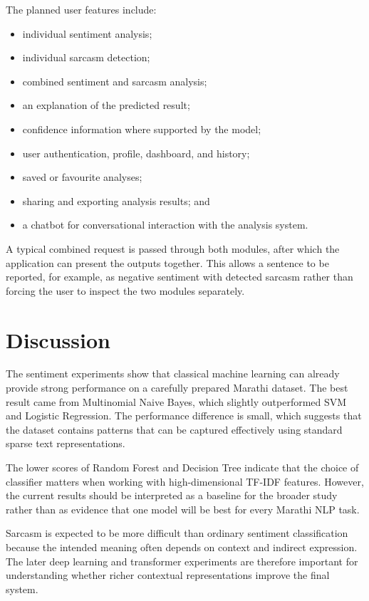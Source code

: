 \documentclass[11pt]{article}
\begin{document}
The planned user features include:
\begin{itemize}
    \item individual sentiment analysis;
    \item individual sarcasm detection;
    \item combined sentiment and sarcasm analysis;
    \item an explanation of the predicted result;
    \item confidence information where supported by the model;
    \item user authentication, profile, dashboard, and history;
    \item saved or favourite analyses;
    \item sharing and exporting analysis results; and
    \item a chatbot for conversational interaction with the analysis system.
\end{itemize}

A typical combined request is passed through both modules, after which the application can present the outputs together. This allows a sentence to be reported, for example, as negative sentiment with detected sarcasm rather than forcing the user to inspect the two modules separately.

\section{Discussion}
The sentiment experiments show that classical machine learning can already provide strong performance on a carefully prepared Marathi dataset. The best result came from Multinomial Naive Bayes, which slightly outperformed SVM and Logistic Regression. The performance difference is small, which suggests that the dataset contains patterns that can be captured effectively using standard sparse text representations.

The lower scores of Random Forest and Decision Tree indicate that the choice of classifier matters when working with high-dimensional TF-IDF features. However, the current results should be interpreted as a baseline for the broader study rather than as evidence that one model will be best for every Marathi NLP task.

Sarcasm is expected to be more difficult than ordinary sentiment classification because the intended meaning often depends on context and indirect expression. The later deep learning and transformer experiments are therefore important for understanding whether richer contextual representations improve the final system.
\end{document}
